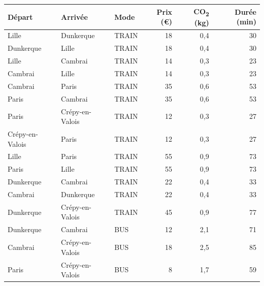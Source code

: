 \documentclass[fontsize=10pt,oneside,parskip=half]{scrreprt}
\begin{document}
\begin{table}[H]
  \centering
  \begin{tabular}{lllrrr}
    \toprule
    \textbf{Départ} & \textbf{Arrivée} & \textbf{Mode}
      & \textbf{Prix (€)} & \textbf{CO\textsubscript{2} (kg)}
      & \textbf{Durée (min)} \\
    \midrule
    Lille             & Dunkerque         & TRAIN  & 18  & 0{,}4  & 30  \\ %
    Dunkerque         & Lille             & TRAIN  & 18  & 0{,}4  & 30  \\
    
    Lille             & Cambrai           & TRAIN  & 14  & 0{,}3  & 23  \\ %
    Cambrai           & Lille             & TRAIN  & 14  & 0{,}3  & 23  \\
    
    Cambrai           & Paris             & TRAIN  & 35  & 0{,}6  & 53  \\ %
    Paris             & Cambrai           & TRAIN  & 35  & 0{,}6  & 53  \\
    
    Paris             & Crépy-en-Valois   & TRAIN  & 12  & 0{,}3  & 27  \\ %
    Crépy-en-Valois   & Paris             & TRAIN  & 12  & 0{,}3  & 27  \\
    
    Lille             & Paris             & TRAIN  & 55  & 0{,}9  & 73  \\ %
    Paris             & Lille             & TRAIN  & 55  & 0{,}9  & 73  \\
    
    Dunkerque         & Cambrai           & TRAIN  & 22  & 0{,}4  & 33  \\ %
    Cambrai           & Dunkerque         & TRAIN  & 22  & 0{,}4  & 33  \\
    
    Dunkerque         & Crépy-en-Valois   & TRAIN  & 45  & 0{,}9  & 77  \\ %
    
    Dunkerque         & Cambrai           & BUS    & 12  & 2{,}1  & 71  \\ %
    Cambrai           & Crépy-en-Valois   & BUS    & 18  & 2{,}5  & 85  \\ %
    Paris             & Crépy-en-Valois   & BUS    & 8   & 1{,}7  & 59  \\ %
    

\end{tabular}
\end{table}
\end{document}
